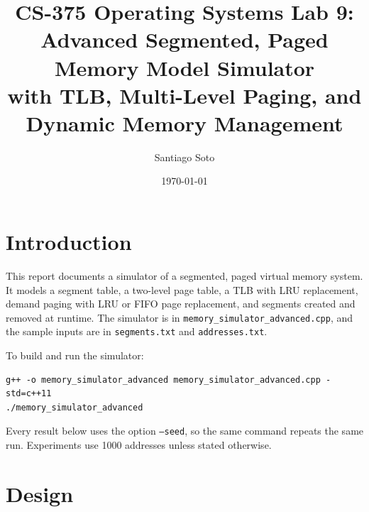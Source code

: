 \documentclass[11pt]{article}
\newcommand{\code}[1]{\texttt{#1}}
\begin{document}
\sloppy

\title{CS-375 Operating Systems Lab 9:\\Advanced Segmented, Paged Memory Model Simulator\\
with TLB, Multi-Level Paging, and Dynamic Memory Management}
\author{Santiago Soto}
\date{\today}
\maketitle

\tableofcontents
\newpage

\section{Introduction}
This report documents a simulator of a segmented, paged virtual memory system.
It models a segment table, a two-level page table, a TLB with LRU replacement,
demand paging with LRU or FIFO page replacement, and segments created and
removed at runtime. The simulator is in
\code{memory\_simulator\_advanced.cpp}, and the sample inputs are in
\code{segments.txt} and \code{addresses.txt}.

To build and run the simulator:
\begin{lstlisting}
g++ -o memory_simulator_advanced memory_simulator_advanced.cpp -std=c++11
./memory_simulator_advanced
\end{lstlisting}

Every result below uses the option \code{--seed}, so the same command repeats
the same run. Experiments use 1000 addresses unless stated otherwise.

\section{Design}
\end{document}
